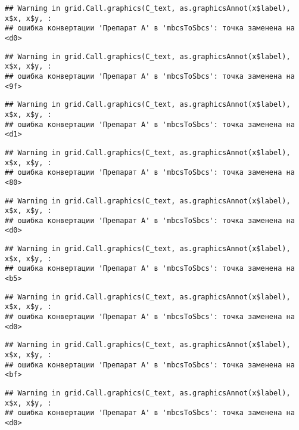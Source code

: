 \documentclass[
]{article}
\begin{document}
\begin{verbatim}
## Warning in grid.Call.graphics(C_text, as.graphicsAnnot(x$label), x$x, x$y, :
## ошибка конвертации 'Препарат A' в 'mbcsToSbcs': точка заменена на <d0>
\end{verbatim}

\begin{verbatim}
## Warning in grid.Call.graphics(C_text, as.graphicsAnnot(x$label), x$x, x$y, :
## ошибка конвертации 'Препарат A' в 'mbcsToSbcs': точка заменена на <9f>
\end{verbatim}

\begin{verbatim}
## Warning in grid.Call.graphics(C_text, as.graphicsAnnot(x$label), x$x, x$y, :
## ошибка конвертации 'Препарат A' в 'mbcsToSbcs': точка заменена на <d1>
\end{verbatim}

\begin{verbatim}
## Warning in grid.Call.graphics(C_text, as.graphicsAnnot(x$label), x$x, x$y, :
## ошибка конвертации 'Препарат A' в 'mbcsToSbcs': точка заменена на <80>
\end{verbatim}

\begin{verbatim}
## Warning in grid.Call.graphics(C_text, as.graphicsAnnot(x$label), x$x, x$y, :
## ошибка конвертации 'Препарат A' в 'mbcsToSbcs': точка заменена на <d0>
\end{verbatim}

\begin{verbatim}
## Warning in grid.Call.graphics(C_text, as.graphicsAnnot(x$label), x$x, x$y, :
## ошибка конвертации 'Препарат A' в 'mbcsToSbcs': точка заменена на <b5>
\end{verbatim}

\begin{verbatim}
## Warning in grid.Call.graphics(C_text, as.graphicsAnnot(x$label), x$x, x$y, :
## ошибка конвертации 'Препарат A' в 'mbcsToSbcs': точка заменена на <d0>
\end{verbatim}

\begin{verbatim}
## Warning in grid.Call.graphics(C_text, as.graphicsAnnot(x$label), x$x, x$y, :
## ошибка конвертации 'Препарат A' в 'mbcsToSbcs': точка заменена на <bf>
\end{verbatim}

\begin{verbatim}
## Warning in grid.Call.graphics(C_text, as.graphicsAnnot(x$label), x$x, x$y, :
## ошибка конвертации 'Препарат A' в 'mbcsToSbcs': точка заменена на <d0>
\end{verbatim}
\end{document}

